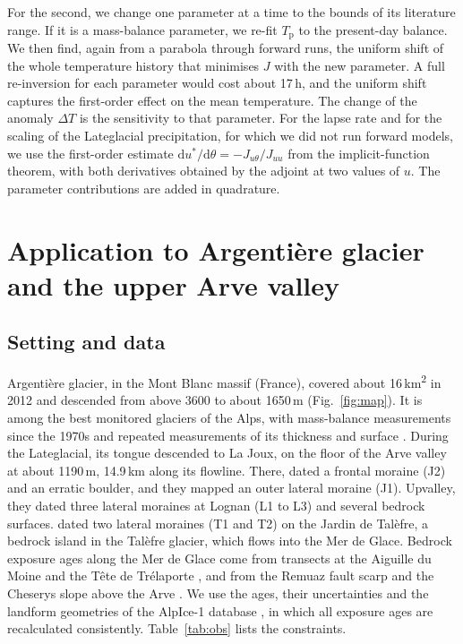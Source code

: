 \documentclass[tc, manuscript]{copernicus}
\begin{document}
For the second, we change one parameter at a time to the bounds of its literature range. If it is a mass-balance parameter, we re-fit $T_\mathrm{p}$ to the present-day balance. We then find, again from a parabola through forward runs, the uniform shift of the whole temperature history that minimises $J$ with the new parameter. A full re-inversion for each parameter would cost about 17\,h, and the uniform shift captures the first-order effect on the mean temperature. The change of the anomaly $\Delta T$ is the sensitivity to that parameter. For the lapse rate and for the scaling of the Lateglacial precipitation, for which we did not run forward models, we use the first-order estimate $\mathrm{d}u^\ast/\mathrm{d}\theta=-J_{u\theta}/J_{uu}$ from the implicit-function theorem, with both derivatives obtained by the adjoint at two values of $u$. The parameter contributions are added in quadrature.


\section{Application to Argenti\`ere glacier and the upper Arve valley}
\label{sec:application}

\subsection{Setting and data}
\label{sec:data}

Argenti\`ere glacier, in the Mont Blanc massif (France), covered about 16\,\unit{km^2} in 2012 and descended from above 3600 to about 1650\,m (Fig.~\ref{fig:map}). It is among the best monitored glaciers of the Alps, with mass-balance measurements since the 1970s and repeated measurements of its thickness and surface \citep{vincent2009,six2014,reveillet2017,rabatel2018,beraud2023}. During the Lateglacial, its tongue descended to La Joux, on the floor of the Arve valley at about 1190\,m, 14.9\,km along its flowline. There, \citet{protin2019} dated a frontal moraine (J2) and an erratic boulder, and they mapped an outer lateral moraine (J1). Upvalley, they dated three lateral moraines at Lognan (L1 to L3) and several bedrock surfaces. \citet{protin2021} dated two lateral moraines (T1 and T2) on the Jardin de Tal\`efre, a bedrock island in the Tal\`efre glacier, which flows into the Mer de Glace. Bedrock exposure ages along the Mer de Glace come from transects at the Aiguille du Moine and the T\^ete de Tr\'elaporte \citep{lehmann2019,lehmann2020}, and from the Remuaz fault scarp and the Cheserys slope above the Arve \citep{cara2017,courtialmanent2023}. We use the ages, their uncertainties and the landform geometries of the AlpIce-1 database \citep{kamleitner2026}, in which all exposure ages are recalculated consistently. Table~\ref{tab:obs} lists the constraints.
\end{document}

